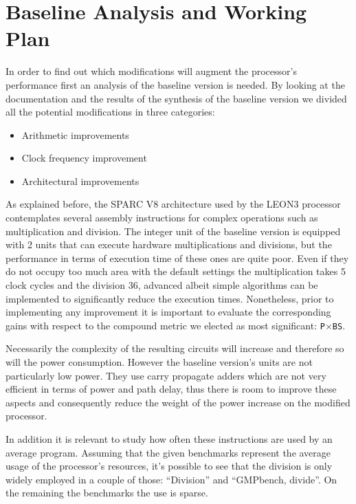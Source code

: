 \section{Baseline Analysis and Working Plan}
\label{sec:baseline}
In order to find out which modifications will augment the processor's performance first an analysis of the baseline version is needed.
By looking at the documentation and the results of the synthesis of the baseline version we divided all the potential modifications in three categories:

\begin{itemize}
  \item Arithmetic improvements
  \item Clock frequency improvement
  \item Architectural improvements
\end{itemize}

As explained before, the SPARC V8 architecture used by the LEON3 processor contemplates several assembly instructions for complex operations such as multiplication and division.
The integer unit of the baseline version is equipped with 2 units that can execute hardware multiplications and divisions, but the performance in terms of execution time of these ones are quite poor.
Even if they do not occupy too much area with the default settings the multiplication takes 5 clock cycles and the division 36, advanced albeit simple algorithms can be implemented to significantly reduce the execution times.
Nonetheless, prior to implementing any improvement it is important to evaluate the corresponding gains with respect to the compound metric we elected as most significant: \texttt{P}$\times$\texttt{BS}.

Necessarily the complexity of the resulting circuits will increase and therefore so will the power consumption. However the baseline version's units are not particularly low power. They use carry propagate adders which are not very efficient in terms of power and path delay, thus there is room to improve these aspects and consequently reduce the weight of the power increase on the modified processor.

In addition it is relevant to study how often these instructions are used by an average program.
Assuming that the given benchmarks represent the average usage of the processor's resources, it's possible to see that the division is only widely employed in a couple of those: ``Division'' and ``GMPbench, divide''. On the remaining the benchmarks the use is sparse.

